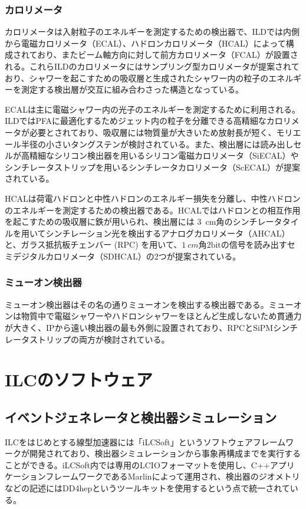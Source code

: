 \subsubsection{カロリメータ}
カロリメータは入射粒子のエネルギーを測定するための検出器で、ILDでは内側から電磁カロリメータ（ECAL）、ハドロンカロリメータ（HCAL）によって構成されており、またビーム軸方向に対して前方カロリメータ（FCAL）が設置される。これらILDのカロリメータにはサンプリング型カロリメータが提案されており、シャワーを起こすための吸収層と生成されたシャワー内の粒子のエネルギーを測定する検出層が交互に組み合わさった構造となっている。

ECALは主に電磁シャワー内の光子のエネルギーを測定するために利用される。ILDではPFAに最適化するためジェット内の粒子を分離できる高精細なカロリメータが必要とされており、吸収層には物質量が大きいため放射長が短く、モリエール半径の小さいタングステンが検討されている。また、検出層には読み出しセルが高精細なシリコン検出器を用いるシリコン電磁カロリメータ（SiECAL）やシンチレータストリップを用いるシンチレータカロリメータ（ScECAL）が提案されている。

HCALは荷電ハドロンと中性ハドロンのエネルギー損失を分離し、中性ハドロンのエネルギーを測定するための検出器である。HCALではハドロンとの相互作用を起こすための吸収層に鉄が用いられ、検出層には \SI{3}{cm}角のシンチレータタイルを用いてシンチレーション光を検出するアナログカロリメータ（AHCAL）と、ガラス抵抗板チェンバー (RPC) を用いて、$\SI{1}{cm}$角$2\mathrm{bit}$の信号を読み出すセミデジタルカロリメータ（SDHCAL）の2つが提案されている。

\subsubsection{ミューオン検出器}
ミューオン検出器はその名の通りミューオンを検出する検出器である。ミューオンは物質中で電磁シャワーやハドロンシャワーをほとんど生成しないため貫通力が大きく、IPから遠い検出器の最も外側に設置されており、RPCとSiPMシンチレータストリップの両方が検討されている。

\section{ILCのソフトウェア}
\subsection{イベントジェネレータと検出器シミュレーション}
ILCをはじめとする線型加速器には「iLCSoft\cite{licsoft}」というソフトウェアフレームワークが開発されており、検出器シミュレーションから事象再構成までを実行することができる。iLCSoft内では専用のLCIOフォーマットを使用し、C++アプリケーションフレームワークであるMarlin\cite{marlin}によって運用され、検出器のジオメトリなどの記述にはDD4hep\cite{dd4hep}というツールキットを使用するという点で統一されている。

